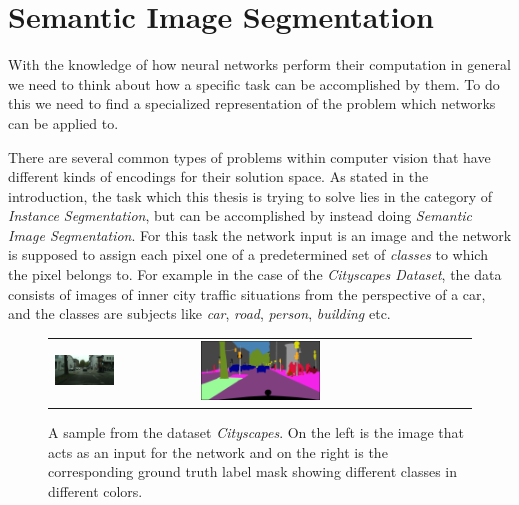 \section{Semantic Image Segmentation}
\label{sec:imseg}

With the knowledge of how neural networks perform their computation in general we need to think about how a specific task can be accomplished by them.
To do this we need to find a specialized representation of the problem which networks can be applied to.

There are several common types of problems within computer vision that have different kinds of encodings for their solution space. As stated in the introduction, the task which this thesis is trying to solve lies in the category of \emph{Instance Segmentation}, but can be accomplished by instead doing \emph{Semantic Image Segmentation}.
For this task the network input is an image and the network is supposed to assign each pixel one of a predetermined set of \emph{classes} to which the pixel belongs to. For example in the case of the \emph{Cityscapes Dataset}\cite{cordtsCityscapesDatasetSemantic2016a}, the data consists of images of inner city traffic situations from the perspective of a car, and the classes are subjects like \emph{car}, \emph{road}, \emph{person}, \emph{building} etc.

\begin{figure}[htbp]
    \centering
    \begin{tabular}{ll}
        \includegraphics[width=0.45\textwidth]{images/aachen_000029_000019_leftImg8bit.png}
        &
        \includegraphics[width=0.45\textwidth]{images/aachen_000029_000019_gtFine_color.png}
    \end{tabular}
    \caption{A sample from the dataset \emph{Cityscapes}. On the left is the image that acts as an input for the network and on the right is the corresponding ground truth label mask showing different classes in different colors. \cite{cordtsCityscapesDatasetSemantic2016a}}
    \label{fig:cityscapes_smpl}
\end{figure}

